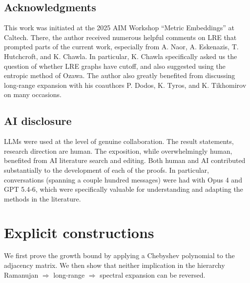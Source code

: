 \documentclass[11pt,reqno]{amsart}
\theoremstyle{definition}
\begin{document}
\subsection*{Acknowledgments}
This work was initiated at the 2025 AIM Workshop ``Metric Embeddings'' at Caltech. There, the author received numerous helpful comments on LRE that prompted parts of the current work, especially from A. Naor, A. Eskenazis, T. Hutchcroft, and K. Chawla. In particular, K. Chawla specifically asked us the question of whether LRE graphs have cutoff, and also suggested using the entropic method of Ozawa. The author also greatly benefited from discussing long-range expansion with his coauthors P. Dodos, K. Tyros, and K. Tikhomirov on many occasions. 

\subsection*{AI disclosure}
LLMs were used at the level of genuine collaboration. The result statements, research direction are human. The exposition, while overwhelmingly human, benefited from AI literature search and editing. Both human and AI contributed substantially to the development of each of the proofs. In particular, conversations (spanning a couple hundred messages) were had with Opus 4 and GPT 5.4-6, which were specifically valuable for understanding and adapting the methods in the literature.





\section{Explicit constructions}
We first prove the growth bound by applying a Chebyshev polynomial to the
adjacency matrix. We then show that neither implication in the hierarchy
Ramanujan $\Longrightarrow$ long-range $\Longrightarrow$ spectral expansion
can be reversed.
\end{document}
